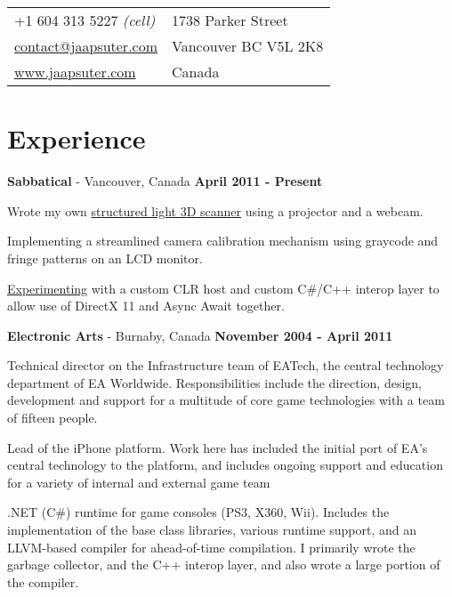 \documentclass[margin, line]{resume}
\begin{document}

\begin{resume}

\vspace{.05in}
\begin{tabular}{@{}p{2in}p{4in}}
+1 604 313 5227 \it{(cell)} 					          & 1738 Parker Street         		\\
\href{mailto:contact@jaapsuter.com }{contact@jaapsuter.com} & Vancouver BC \hspace{1mm}V5L 2K8  \\
\href{http://www.jaapsuter.com}{www.jaapsuter.com}     	 & Canada                            \\
\end{tabular}

\section{\sc Experience}

{\bf Sabbatical} - Vancouver, Canada \hfill {\bf April 2011 - Present}
\\
\begin{list3}
	\item Wrote my own \href{https://github.com/JaapSuter/Pentacorn#readme}{structured light 3D scanner} using a projector and a webcam.
	\item Implementing a streamlined camera calibration mechanism using graycode and fringe patterns on an LCD monitor.
	\item \href{https://github.com/JaapSuter/Ten18#readme}{Experimenting} with a custom CLR host and custom C\#/C++ interop layer to allow use of DirectX 11 and Async Await together.
\end{list3}

{\bf Electronic Arts} - Burnaby, Canada \hfill {\bf November 2004 - April 2011}

Technical director on the Infrastructure team of EATech, the central
technology department of EA Worldwide. Responsibilities include the
direction, design, development and support for a multitude of core
game technologies with a team of fifteen people.

Lead of the iPhone platform. Work here has included the initial port of EA's central technology to the
platform, and includes ongoing support and education for a variety of internal and external game team

.NET (C\#) runtime for game consoles (PS3, X360, Wii). Includes the implementation of the base class
libraries, various runtime support, and an LLVM-based compiler for ahead-of-time compilation. I
primarily wrote the garbage collector, and the C++ interop layer, and also wrote a large portion of the
compiler.


\end{resume}
\end{document}
